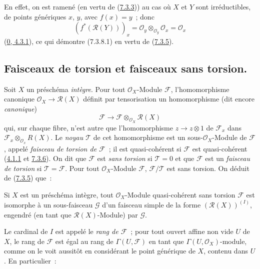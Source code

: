En effet, on est ramené (en vertu de
(\hyperref[I.7.3.3-fr]{7.3.3})) au cas où $X$ et $Y$ sont irréductibles, de
points génériques $x$, $y$, avec $f(x)=y$~; donc
\[
  (f^*(\mathscr{R}(Y)))_x
  =\mathscr{O}_y\otimes_{\mathscr{O}_y}\mathscr{O}_x
  =\mathscr{O}_x
\]
(\hyperref[0.4.3.1-fr]{0, 4.3.1}), ce qui démontre (7.3.8.1) en vertu de
(\hyperref[I.7.3.5-fr]{7.3.5}).

\subsection{Faisceaux de torsion et faisceaux sans torsion.}
\label{subsection:I.7.4-fr}

\begin{env}[7.4.1]
\label{I.7.4.1-fr}
Soit $X$ un préschéma \emph{intègre}. Pour tout $\mathscr{O}_X$-Module
$\mathscr{F}$, l'homomorphisme canonique
$\mathscr{O}_X\to\mathscr{R}(X)$ définit par tensorisation un homomorphisme
(dit encore \emph{canonique})
\[
  \mathscr{F}\to
  \mathscr{F}\otimes_{\mathscr{O}_X}\mathscr{R}(X)
\]
qui, sur chaque fibre, n'est autre que l'homomorphisme $z\to z\otimes 1$ de
$\mathscr{F}_x$ dans
$\mathscr{F}_x\otimes_{\mathscr{O}_x}R(X)$. Le \emph{noyau $\mathscr{T}$}
de cet homomorphisme est un sous-$\mathscr{O}_X$-Module de $\mathscr{F}$,
appelé \emph{faisceau de torsion de $\mathscr{F}$}~; il est quasi-cohérent si
$\mathscr{F}$ est quasi-cohérent
(\hyperref[I.4.1.1-fr]{4.1.1} et \hyperref[I.7.3.6-fr]{7.3.6}). On dit que
$\mathscr{F}$ est \emph{sans torsion} si $\mathscr{T}=0$ et que
$\mathscr{F}$ est un \emph{faisceau de torsion} si
$\mathscr{T}=\mathscr{F}$. Pour tout $\mathscr{O}_X$-Module $\mathscr{F}$,
$\mathscr{F}/\mathscr{T}$ est sans torsion. On déduit de
(\hyperref[I.7.3.5-fr]{7.3.5}) que~:
\end{env}

\begin{proposition}[7.4.2]
\label{I.7.4.2-fr}
Si $X$ est un préschéma intègre, tout $\mathscr{O}_X$-Module quasi-cohérent
sans torsion $\mathscr{F}$ est isomorphe à un sous-faisceau $\mathscr{G}$
d'un faisceau simple de la forme $(\mathscr{R}(X))^{(I)}$, engendré (en tant
que $\mathscr{R}(X)$-Module) par $\mathscr{G}$.
\end{proposition}

Le cardinal de $I$ est appelé le \emph{rang de $\mathscr{F}$}~; pour tout
ouvert affine non vide $U$ de $X$, le rang de $\mathscr{F}$ est égal au rang
de $\Gamma(U,\mathscr{F})$ en tant que $\Gamma(U,\mathscr{O}_X)$-module,
comme on le voit aussitôt en considérant le point générique de $X$, contenu
dans $U$. En particulier~:

